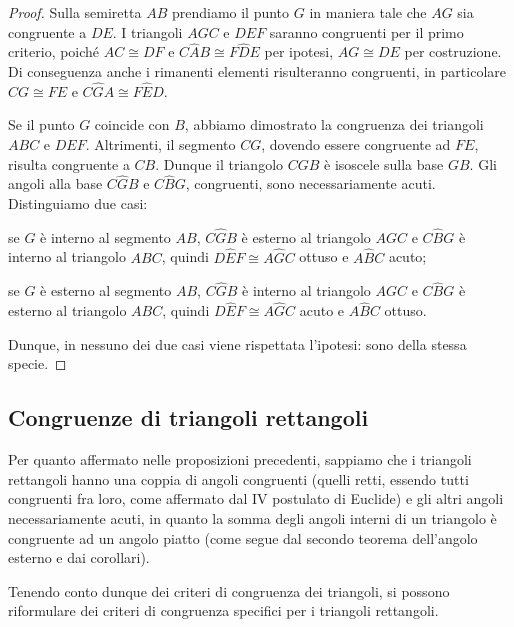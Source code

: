 \begin{proof}
Sulla semiretta $AB$ prendiamo il punto $G$ in maniera tale che $AG$ sia congruente a $DE$. I triangoli $AGC$ e $DEF$ saranno congruenti per il primo criterio, poiché $AC\cong DF$ e $C\widehat{A}B\cong F\widehat{D}E$ per ipotesi, $AG\cong DE$ per costruzione. Di conseguenza anche i rimanenti elementi risulteranno congruenti, in particolare $CG\cong FE$ e $C\widehat{G}A\cong F\widehat{E}D$.

Se il punto $G$ coincide con $B$, abbiamo dimostrato la congruenza dei triangoli $ABC$ e $DEF$. Altrimenti, il segmento $CG$, dovendo essere congruente ad $FE$, risulta congruente a $CB$. Dunque il triangolo $CGB$ è isoscele sulla base $GB$. Gli angoli alla base $C\widehat{G}B$ e $C\widehat{B}G$, congruenti, sono necessariamente acuti. Distinguiamo due casi:
\begin{itemize*}
\item se $G$ è interno al segmento $AB$, $C\widehat{G}B$ è esterno al triangolo $AGC$ e $C\widehat{B}G$ è interno al triangolo $ABC$, quindi $D\widehat{E}F\cong A\widehat{G}C$ ottuso e $A\widehat{B}C$ acuto;
\item se $G$ è esterno al segmento $AB$, $C\widehat{G}B$ è interno al triangolo $AGC$ e $C\widehat{B}G$ è esterno al triangolo $ABC$, quindi $D\widehat{E}F\cong A\widehat{G}C$ acuto e $A\widehat{B}C$ ottuso.
\end{itemize*}
Dunque, in nessuno dei due casi viene rispettata l'ipotesi: sono della stessa specie.
\end{proof}

\subsection{Congruenze di triangoli rettangoli}

Per quanto affermato nelle proposizioni precedenti, sappiamo che i triangoli rettangoli hanno una coppia di angoli congruenti (quelli retti, essendo tutti congruenti fra loro, come affermato dal IV postulato di Euclide) e gli altri angoli necessariamente acuti, in quanto la somma degli angoli interni di un triangolo è congruente ad un angolo piatto (come segue dal secondo teorema dell'angolo esterno e dai corollari).

Tenendo conto dunque dei criteri di congruenza dei triangoli, si possono riformulare dei criteri di congruenza specifici per i triangoli rettangoli.

